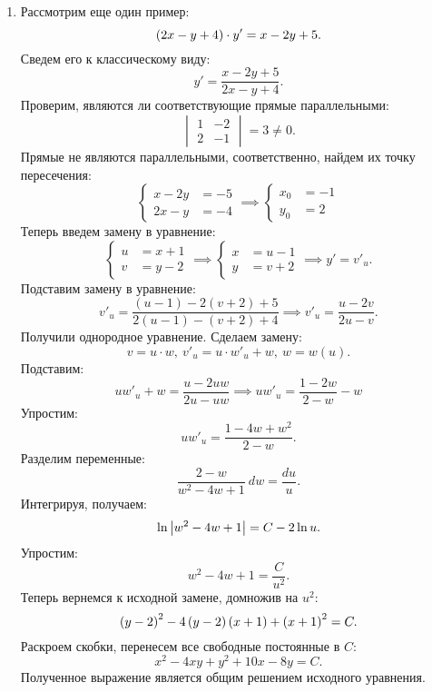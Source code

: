 \begin{enumerate}
			\item Рассмотрим еще один пример:
				\[ \left( 2x - y + 4 \right) \cdot y' = x - 2y + 5. \]
				Сведем его к классическому виду:
				\[ y' = \frac{x - 2y + 5}{2x - y + 4}. \]
				Проверим, являются ли соответствующие прямые параллельными:
				\[ \begin{vmatrix} 1 & -2 \\ 2 & -1 \end{vmatrix} = 3 \neq 0. \]
				Прямые не являются параллельными, соответственно, найдем их точку пересечения:
				\[ \left\lbrace \begin{split} x - 2y &= -5 \\ 2x - y &= -4 \end{split} \right. \implies \left\lbrace \begin{split} x_0 &= -1 \\ y_0 &= 2 \end{split} \right. \]
				Теперь введем замену в уравнение:
				\[ \left\lbrace \begin{split} u &= x + 1 \\ v &= y - 2 \end{split} \right. \implies \left\lbrace \begin{split} x &= u - 1 \\ y &= v + 2 \end{split} \right. \implies y' = v'_u. \]
				Подставим замену в уравнение:
				\[ v'_u = \frac{(u - 1) - 2(v + 2) + 5}{2 (u - 1) - (v + 2) + 4} \implies v'_u = \frac{u - 2v}{2u - v}. \]
				Получили однородное уравнение. Сделаем замену:
				\[ v = u \cdot w, ~ v'_u = u \cdot w'_u + w, ~ w = w(u). \]
				Подставим:
				\[ uw'_u + w = \frac{u - 2uw}{2u - uw} \implies uw'_u = \frac{1 - 2w}{2 - w} - w \]
				Упростим:
				\[ uw'_u = \frac{1 - 4w + w^2}{2 - w}. \]
				Разделим переменные:
				\[ \frac{2 - w}{w^2 - 4w + 1} ~ dw = \frac{du}{u}. \]
				Интегрируя, получаем:
				\[ \ln\left\vert w^2 - 4w + 1 \right\vert = C - 2 \ln{u}. \]
				Упростим:
				\[ w^2 - 4w + 1 = \frac{C}{u^2}. \]
				Теперь вернемся к исходной замене, домножив на $u^2$:
				\[ \left( y - 2 \right)^2 - 4 \left( y - 2 \right) \left( x + 1 \right) + \left( x + 1 \right)^2 = C. \]
				Раскроем скобки, перенесем все свободные постоянные в $C$:
				\[ x^2 - 4xy + y^2 + 10x - 8 y = C. \]
				Полученное выражение является общим решением исходного уравнения.


\end{enumerate}
